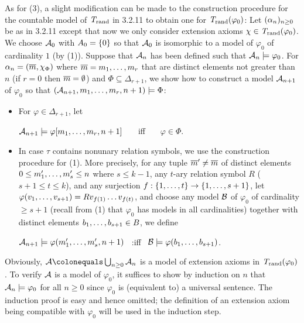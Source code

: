 \begin{enumerate}[1.]
As for (3), a slight modification can be made to the construction procedure for the countable model of $\mathit{T}_{\mathrm{rand}}$ in 3.2.11 to obtain one for $\mathit{T}_{\mathrm{rand}}(\varphi_0)$: Let $(\alpha_n)_{n \geq 0}$ be as in 3.2.11 except that now we only consider extension axioms $\extaxm \in \randstrtheory(\varphi_0)$. We choose $\mathcal{A}_0$ with $A_0 = {\{0\}}$ so that $\mathcal{A}_0$ is isomorphic to a model of $\varphi_0$ of cardinality $1$ (by (1)). Suppose that $\mathcal{A}_n$ has been defined such that $\mathcal{A}_n \models \varphi_0$. For $\alpha_n = (\vect{m}, \extaxm[\Phi])$ where $\overline{m} = m_1, \ldots, m_r$ that are distinct elements not greater than $n$ (if $r = 0$ then $\overline{m} = \emptyset$) and $\Phi \subseteq \Delta_{r + 1}$, we show how to construct a model $\mathcal{A}_{n + 1}$ of $\varphi_0$ so that $(\mathcal{A}_{n + 1}, m_1, \ldots, m_r, n + 1) \models \Phi$:
\begin{itemize}
\item For $\varphi \in \Delta_{r + 1}$, let
\begin{center}
$\mathcal{A}_{n + 1} \models \varphi [m_1, \ldots, m_r, n + 1]$ \ \ \ iff \ \ \ $\varphi \in \Phi$.
\end{center}
\item In case $\tau$ contains nonunary relation symbols, we use the construction procedure for (1). More precisely, for any tuple $\overline{m}' \neq \overline{m}$ of distinct elements $0 \leq m_1', \ldots, m_s' \leq n$ where $s \leq k - 1$, any $t$-ary relation symbol $R$ ($s + 1 \leq t \leq k$), and any surjection $f : {\{1, \ldots, t\}} \to {\{1, \ldots, s + 1\}}$, let $\varphi(v_1, \ldots, v_{s + 1}) = Rv_{f(1)} \ldots v_{f(t)}$, and choose any model $\mathcal{B}$ of $\varphi_0$ of cardinality $\geq s + 1$ (recall from (1) that $\varphi_0$ has models in all cardinalities) together with distinct elements $b_1, \ldots, b_{s + 1} \in B$, we define
\begin{center}
$\mathcal{A}_{n + 1} \models \varphi(m_1', \ldots, m_s', n + 1)$ \ :iff \ $\mathcal{B} \models \varphi(b_1, \ldots, b_{s + 1})$.
\end{center}
\end{itemize}
Obviously, $\strct{A} \defas \bunion_{n \geq 0} \strct{A}_n$ is a model of extension axioms in $\mathit{T}_{\mathrm{rand}}(\varphi_0)$. To verify $\mathcal{A}$ is a model of $\varphi_0$, it suffices to show by induction on $n$ that $\mathcal{A}_n \models \varphi_0$ for all $n \geq 0$ since $\varphi_0$ is (equivalent to) a universal sentence. The induction proof is easy and hence omitted; the definition of an extension axiom being compatible with $\varphi_0$ will be used in the induction step.


\end{enumerate}
